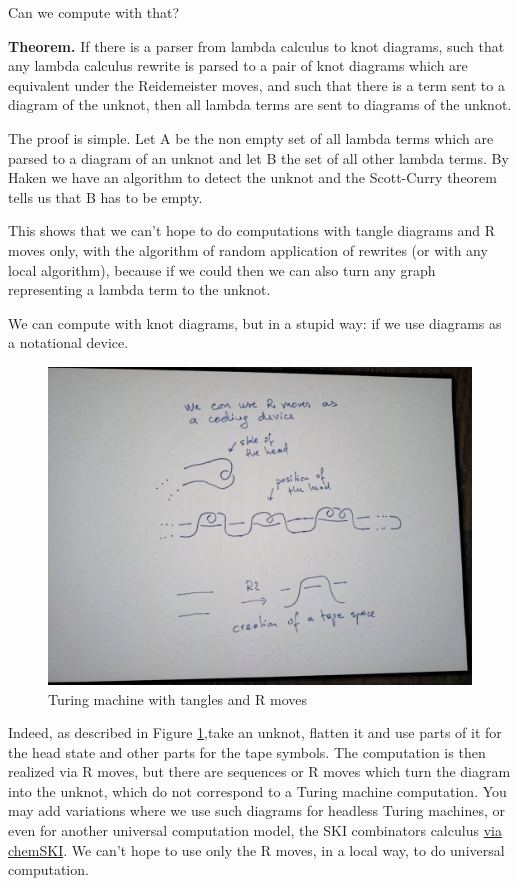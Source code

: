 \documentclass[]{article}
\begin{document}
Can we compute with that?

\textbf{Theorem.} If there is a parser from lambda calculus to knot
diagrams, such that any lambda calculus rewrite is parsed to a pair of
knot diagrams which are equivalent under the Reidemeister moves, and
such that there is a term sent to a diagram of the unknot, then all
lambda terms are sent to diagrams of the unknot.

The proof is simple. Let A be the non empty set of all lambda terms
which are parsed to a diagram of an unknot and let B the set of all
other lambda terms. By Haken we have an algorithm to detect the unknot
and the Scott-Curry theorem tells us that B has to be empty.

This shows that we can't hope to do computations with tangle diagrams
and R moves only, with the algorithm of random application of rewrites
(or with any local algorithm), because if we could then we can also turn
any graph representing a lambda term to the unknot.

We can compute with knot diagrams, but in a stupid way: if we use
diagrams as a notational device.

\begin{figure}[h!]
\centering
\includegraphics[width=0.75\linewidth]{img/3633.jpg}
\caption{Turing machine with tangles and R moves}
\label{Turing-machine-with-tangles-and-R-moves}
\end{figure}

Indeed, as described in Figure \ref{Turing-machine-with-tangles-and-R-moves},take an unknot, flatten it and use parts of it for the head state and other parts for the tape symbols. The computation is then
realized via R moves, but there are sequences or R moves which turn the
diagram into the unknot, which do not correspond to a Turing machine
computation. You may add variations where we use such diagrams for
headless Turing machines, or even for another universal computation
model, the SKI combinators calculus
\href{https://mbuliga.github.io/chemski/chemski.html\#SKInote}{via
chemSKI}. We can't hope to use only the R moves, in a local way, to do 
universal computation.
\end{document}
